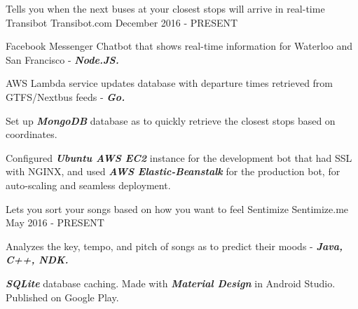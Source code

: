 \begin{cventries}
	\cventry
    {Tells you when the next buses at your closest stops will arrive in real-time}
    {Transibot}
    {Transibot.com}
    {December 2016 - PRESENT}
    {
      \begin{cvitems}
        \item {Facebook Messenger Chatbot that shows real-time information for Waterloo and San Francisco - \textbf{\textit{Node.JS.}}}
        \item {AWS Lambda service updates database with departure times retrieved from GTFS/Nextbus feeds - \textbf{\textit{Go.}}}
        \item {Set up \textbf{\textit{MongoDB}} database as to quickly retrieve the closest stops based on coordinates.}
        \item {Configured \textbf{\textit{Ubuntu AWS EC2}} instance for the development bot that had SSL with NGINX, and used \textbf{\textit{AWS Elastic-Beanstalk}} for the production bot, for auto-scaling and seamless deployment.}
      \end{cvitems}
    }
  \cventry
    {Lets you sort your songs based on how you want to feel}
    {Sentimize}
    {Sentimize.me}
    {May 2016 - PRESENT}
    {
      \begin{cvitems}
        \item {Analyzes the key, tempo, and pitch of songs as to predict their moods - \textbf{\textit{Java, C++, NDK.}}}
        \item {\textbf{\textit{SQLite}} database caching. Made with \textbf{\textit{Material Design}} in Android Studio. Published on Google Play.}
      \end{cvitems}
    }
\end{cventries}

